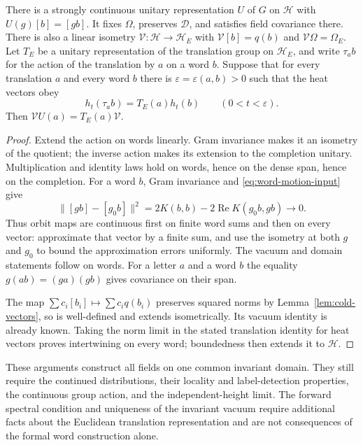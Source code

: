 \begin{proposition}\label{prop:word-motion}
There is a strongly continuous unitary representation $U$ of $G$ on
$\mathcal H$ with $U(g)[b]=[gb]$. It fixes $\Omega$, preserves $\mathcal D$,
and satisfies field covariance there. There is also a linear isometry
$\mathcal V:\mathcal H\to\mathcal H_E$ with $\mathcal V[b]=q(b)$ and
$\mathcal V\Omega=\Omega_E$. Let $T_E$ be a unitary representation of the
translation group on $\mathcal H_E$, and write $\tau_ab$ for the action
of the translation by $a$ on a word $b$. Suppose that for every
translation $a$ and every word $b$ there is $\varepsilon=\varepsilon(a,b)>0$
such that the heat vectors obey
\[
 h_t(\tau_ab)=T_E(a)h_t(b)\qquad(0<t<\varepsilon).
\]
Then
$\mathcal VU(a)=T_E(a)\mathcal V$.
\end{proposition}
\begin{proof}
Extend the action on words linearly. Gram invariance makes it an isometry
of the quotient; the inverse action makes its extension to the completion
unitary. Multiplication and identity laws hold on words, hence on the dense
span, hence on the completion. For a word $b$, Gram invariance and
\eqref{eq:word-motion-input} give
\[
 \|[gb]-[g_0b]\|^2
 =2K(b,b)-2\operatorname{Re}K(g_0b,gb)\longrightarrow0.
\]
Thus orbit maps are continuous first on finite word sums and then on every
vector: approximate that vector by a finite sum, and use the isometry at both
$g$ and $g_0$ to bound the approximation errors uniformly. The vacuum and
domain statements follow on words. For a letter $a$ and a word $b$ the
equality $g(ab)=(ga)(gb)$ gives covariance on their span.

The map $\sum c_i[b_i]\mapsto\sum c_iq(b_i)$ preserves squared norms by
Lemma~\ref{lem:cold-vectors}, so is well-defined and extends isometrically.
Its vacuum identity is already known. Taking the norm limit in the stated
translation identity for heat vectors proves intertwining on every word;
boundedness then extends it to $\mathcal H$.
\end{proof}

These arguments construct all fields on one common invariant domain. They
still require the continued distributions, their locality and label-detection
properties, the continuous group action, and the independent-height limit.
The forward spectral condition and uniqueness of the invariant vacuum require
additional facts about the Euclidean translation representation and are not
consequences of the formal word construction alone.
